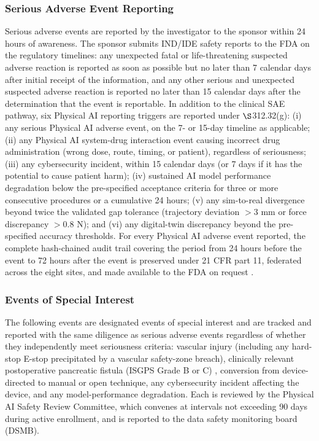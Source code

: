 \subsubsection{Serious Adverse Event Reporting}

Serious adverse events are reported by the investigator to the sponsor within
24 hours of awareness. The sponsor submits IND/IDE safety reports to the FDA on the
regulatory timelines: any unexpected fatal or life-threatening suspected adverse
reaction is reported as soon as possible but no later than 7 calendar days after
initial receipt of the information, and any other serious and unexpected suspected
adverse reaction is reported no later than 15 calendar days after the determination
that the event is reportable. In addition to the clinical SAE pathway, six Physical
AI reporting triggers are reported under $\S$312.32(g): (i) any serious Physical AI
adverse event, on the 7- or 15-day timeline as applicable; (ii) any Physical AI
system-drug interaction event causing incorrect drug administration (wrong dose,
route, timing, or patient), regardless of seriousness; (iii) any cybersecurity
incident, within 15 calendar days (or 7 days if it has the potential to cause patient
harm); (iv) sustained AI model performance degradation below the pre-specified
acceptance criteria for three or more consecutive procedures or a cumulative 24
hours; (v) any sim-to-real divergence beyond twice the validated gap tolerance
(trajectory deviation $> 3$ mm or force discrepancy $> 0.8$ N); and (vi) any
digital-twin discrepancy beyond the pre-specified accuracy thresholds. For every
Physical AI adverse event reported, the complete hash-chained audit trail covering
the period from 24 hours before the event to 72 hours after the event is preserved
under 21 CFR part 11, federated across the eight sites, and made available to the FDA
on request \cite{ecfr2026part11}.

\subsubsection{Events of Special Interest}

The following events are designated events of special interest and are tracked and
reported with the same diligence as serious adverse events regardless of whether they
independently meet seriousness criteria: vascular injury (including any hard-stop
E-stop precipitated by a vascular safety-zone breach), clinically relevant
postoperative pancreatic fistula (ISGPS Grade B or C) \cite{Bassi2017}, conversion
from device-directed to manual or open technique, any cybersecurity incident
affecting the device, and any model-performance degradation. Each is reviewed by the
Physical AI Safety Review Committee, which convenes at intervals not exceeding 90 days
during active enrollment, and is reported to the data safety monitoring board (DSMB).

